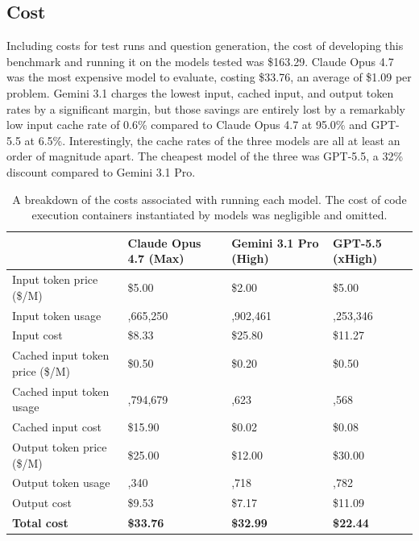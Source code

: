 \documentclass[10pt,letterpaper,twocolumn]{article}
\begin{document}
\subsection{Cost}

Including costs for test runs and question generation, the cost of developing this benchmark and running it on the models tested was \$163.29. Claude Opus 4.7 was the most expensive model to evaluate, costing \$33.76, an average of \$1.09 per problem. Gemini 3.1 charges the lowest input, cached input, and output token rates by a significant margin, but those savings are entirely lost by a remarkably low input cache rate of 0.6\% compared to Claude Opus 4.7 at 95.0\% and GPT-5.5 at 6.5\%. Interestingly, the cache rates of the three models are all at least an order of magnitude apart. The cheapest model of the three was GPT-5.5, a 32\% discount compared to Gemini 3.1 Pro.


\begin{table}[htbp]
  \centering
  \setlength{\tabcolsep}{2pt}
  \begin{tabular}{|>{\raggedright\arraybackslash}p{}|>{\centering\arraybackslash}p{}|>{\centering\arraybackslash}p{}|>{\centering\arraybackslash}p{}|}
    \cline{2-4}
    \multicolumn{1}{c|}{} & \textbf{Claude Opus 4.7 (Max)} & \textbf{Gemini 3.1 Pro (High)} & \textbf{GPT-5.5 (xHigh)} \\ \hline
    Input token price (\$/M)        & \$5.00  & \$2.00  & \$5.00  \\ \hline
    Input token usage               & 1,665,250 & 12,902,461 & 2,253,346 \\ \hline
    Input cost                      & \$8.33  & \$25.80 & \$11.27 \\ \hline
    Cached input token price (\$/M) & \$0.50  & \$0.20  & \$0.50  \\ \hline
    Cached input token usage        & 31,794,679 & 76,623 & 157,568 \\ \hline
    Cached input cost               & \$15.90 & \$0.02  & \$0.08  \\ \hline
    Output token price (\$/M)       & \$25.00 & \$12.00 & \$30.00 \\ \hline
    Output token usage              & 381,340 & 597,718 & 369,782 \\ \hline
    Output cost                     & \$9.53  & \$7.17  & \$11.09 \\ \hline
    \textbf{Total cost}             & \textbf{\$33.76} & \textbf{\$32.99} & \textbf{\$22.44} \\ \hline
  \end{tabular}
  \caption{A breakdown of the costs associated with running each model. The cost of code execution containers instantiated by models was negligible and omitted.}
  \label{tab:cost_table}
\end{table}
\end{document}
